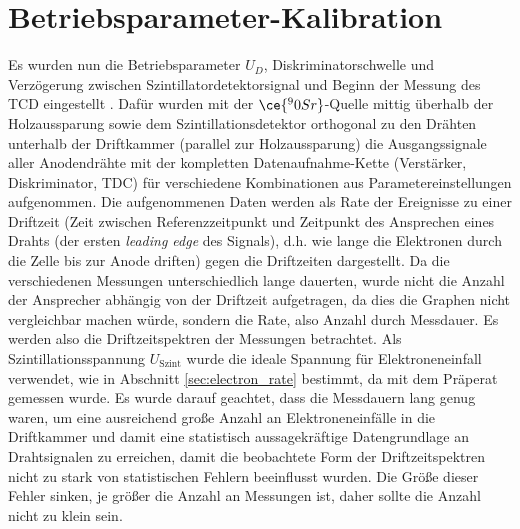 \chapter{Betriebsparameter-Kalibration} \label{sec:parameter}

Es wurden nun die Betriebsparameter $U_D$, Diskriminatorschwelle und Verzögerung zwischen Szintillatordetektorsignal und Beginn der Messung des TCD eingestellt \cite[3]{515versuchsanleitung}. Dafür wurden mit der $\ce{^90Sr}$-Quelle mittig überhalb der Holzaussparung sowie dem Szintillationsdetektor orthogonal zu den Drähten unterhalb der Driftkammer (parallel zur Holzaussparung) die Ausgangssignale aller Anodendrähte mit der kompletten Datenaufnahme-Kette (Verstärker, Diskriminator, TDC) für verschiedene Kombinationen aus Parametereinstellungen aufgenommen.
Die aufgenommenen Daten werden als Rate der Ereignisse zu einer Driftzeit (Zeit zwischen Referenzzeitpunkt und Zeitpunkt des Ansprechen eines Drahts (der ersten \textit{leading edge} des Signals), d.h. wie lange die Elektronen durch die Zelle bis zur Anode driften) gegen die Driftzeiten dargestellt. Da die verschiedenen Messungen unterschiedlich lange dauerten, wurde nicht die Anzahl der Ansprecher abhängig von der Driftzeit aufgetragen, da dies die Graphen nicht vergleichbar machen würde, sondern die Rate, also Anzahl durch Messdauer. Es werden also die Driftzeitspektren der Messungen betrachtet. Als Szintillationsspannung $U_\text{Szint}$ wurde die ideale Spannung für Elektroneneinfall verwendet, wie in Abschnitt \ref{sec:electron_rate} bestimmt, da mit dem Präperat gemessen wurde. Es wurde darauf geachtet, dass die Messdauern lang genug waren, um eine ausreichend große Anzahl an Elektroneneinfälle in die Driftkammer und damit eine statistisch aussagekräftige Datengrundlage an Drahtsignalen zu erreichen, damit die beobachtete Form der Driftzeitspektren nicht zu stark von statistischen Fehlern beeinflusst wurden. Die Größe dieser Fehler sinken, je größer die Anzahl an Messungen ist, daher sollte die Anzahl nicht zu klein sein.

